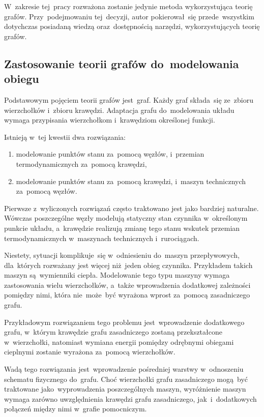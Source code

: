 W~zakresie tej~pracy rozważona zostanie jedynie metoda wykorzystująca
teorię grafów. Przy~podejmowaniu tej~decyzji, autor pokierował~się
przede~wszystkim dotychczas posiadaną wiedzą oraz~dostępnością narzędzi,
wykorzystujących teorię grafów.


\subsection{Zastosowanie teorii grafów do~modelowania obiegu}

Podstawowym pojęciem teorii grafów jest~graf. Każdy graf składa~się
ze~zbioru wierzchołków i~zbioru krawędzi. Adaptacja grafu do~modelowania
układu wymaga przypisania wierzchołkom i~krawędziom określonej funkcji.

Istnieją w~tej kwestii dwa rozwiązania:

\begin{enumerate}
	\item modelowanie punktów stanu za~pomocą węzłów, i~przemian
		termodynamicznych za~pomocą krawędzi,

	\item modelowanie punktów stanu za~pomocą krawędzi, i~maszyn
		technicznych za~pomocą węzłów.
\end{enumerate}



Pierwsze z~wyliczonych rozwiązań często traktowano jest jako bardziej
naturalne. Wówczas poszczególne węzły modelują statyczny stan czynnika
w~określonym punkcie układu, a~krawędzie realizują zmianę tego stanu
wskutek przemian termodynamicznych w~maszynach technicznych
i~rurociągach.

Niestety, sytuacji komplikuje~się w~odniesieniu do~maszyn przepływowych,
dla~których rozważany jest więcej niż~jeden obieg czynnika. Przykładem
takich maszyn są~wymienniki ciepła. Modelowanie tego typu maszyny wymaga
zastosowania wielu wierzchołków, a~także wprowadzenia dodatkowej
zależności pomiędzy nimi, która nie~może~być wyrażona wprost za~pomocą
zasadniczego grafu.

Przykładowym rozwiązaniem tego problemu jest~wprowadzenie dodatkowego
grafu, w~którym krawędzie grafu zasadniczego zostaną przekształcone
w~wierzchołki, natomiast wymiana energii pomiędzy odrębnymi obiegami
cieplnymi zostanie wyrażona za~pomocą wierzchołków.

Wadą tego rozwiązania jest~wprowadzenie pośredniej warstwy w~odnoszeniu
schematu fizycznego do~grafu. Choć wierzchołki grafu zasadniczego
mogą~być traktowane jako~wyprowadzenia poszczególnych maszyn,
wyróżnienie maszyn wymaga zarówno uwzględnienia krawędzi grafu
zasadniczego, jak~i~dodatkowych połączeń między nimi w~grafie
pomocniczym.

